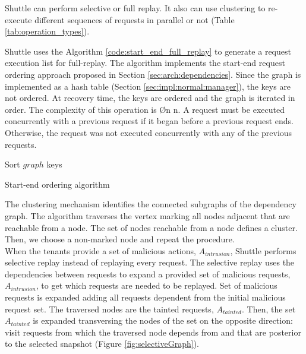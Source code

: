 Shuttle can perform selective or full replay. It also can use clustering to re-execute different sequences of requests in parallel or not (Table \ref{tab:operation_types}).

Shuttle uses the Algorithm \ref{code:start_end_full_replay} to generate a request execution list for full-replay. The algorithm implements the start-end request ordering approach proposed in Section \ref{sec:arch:dependencies}. Since the graph is implemented as a hash table (Section \ref{sec:impl:normal:manager}), the keys are not ordered. At recovery time, the keys are ordered and the graph is iterated in order. The complexity of this operation is \O{n \log{} n}. A request must be executed concurrently with a previous request if it began before a previous request ends. Otherwise, the request was not executed concurrently with any of the previous requests.

\begin{algorithm}[H]
\DontPrintSemicolon{}
	  \BlankLine
	  Sort $graph$ keys\;
	  \BlankLine
	\caption{Start-end ordering algorithm}
	\label{code:start_end_full_replay}
\end{algorithm}


The clustering mechanism identifies the connected subgraphs of the dependency graph. The algorithm traverses the vertex marking all nodes adjacent that are reachable from a node. The set of nodes reachable from a node defines a cluster. Then, we choose a non-marked node and repeat the procedure.\\

When the tenants provide a set of malicious actions, $A_{intrusion}$, Shuttle performs selective replay instead of replaying every request. The selective replay uses the dependencies between requests to expand a provided set of malicious requests, $A_{intrusion}$,  to get which requests are needed to be replayed. Set of malicious requests is expanded adding all requests dependent from the initial malicious request set. The traversed nodes are the tainted requests, $A_{tainted}$. Then, the set $A_{tainted}$ is expanded transversing the nodes of the set on the opposite direction: visit requests from which the traversed node depends from and that are posterior to the selected snapshot (Figure \ref{fig:selectiveGraph}). 


